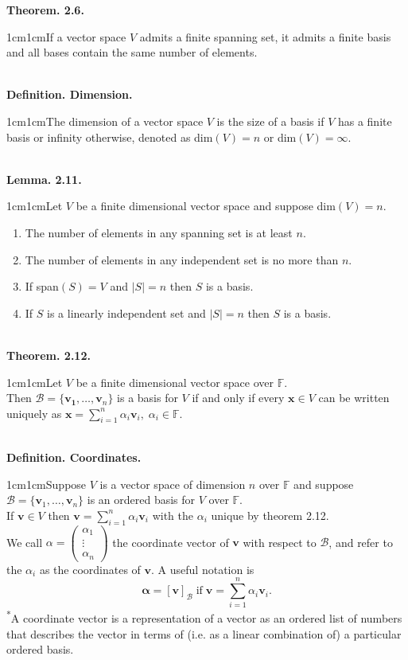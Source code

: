 \documentclass{article}
\newcommand{\vect}[1]{\mathbf{#1}}
\newcommand{\definition}[2]{\textbf{Definition. #1.}\begin{adjustwidth}{1cm}{1cm}#2\end{adjustwidth}}
\newcommand{\theorem}[2]{\textbf{Theorem. #1.}\begin{adjustwidth}{1cm}{1cm}#2\end{adjustwidth}}
\newcommand{\lemma}[2]{\textbf{Lemma. #1.}\begin{adjustwidth}{1cm}{1cm}#2\end{adjustwidth}}
\begin{document}
\theorem{2.6}{If a vector space $V$ admits a finite spanning set, it admits a finite basis and all bases contain the same number of elements.}~\\
\definition{Dimension}{The dimension of a vector space $V$ is the size of a basis if $V$ has a finite basis or infinity otherwise, denoted as dim$(V) = n$ or dim$(V) = \infty$.}~\\
\lemma{2.11}{Let $V$ be a finite dimensional vector space and suppose dim$(V) = n$. \begin{enumerate} \item The number of elements in any spanning set is at least $n$. \item The number of elements in any independent set is no more than $n$. \item If span$(S) = V$ and $|S| = n$ then $S$ is a basis. \item If $S$ is a linearly independent set and $|S| = n$ then $S$ is a basis. \end{enumerate} }~\\
\theorem{2.12}{Let $V$ be a finite dimensional vector space over $\mathbb{F}$.\\Then $\mathcal{B} = \{ \vect{v_1}, \ldots , \vect{v}_n \}$ is a basis for $V$ if and only if every $\vect{x} \in V$ can be written uniquely as $\vect{x} = \sum_{i=1}^n \alpha _i \vect{v}_i, \; \alpha _i \in \mathbb{F}$.}~\\
\definition{Coordinates}{Suppose $V$ is a vector space of dimension $n$ over $\mathbb{F}$ and suppose $\mathcal{B} = \{ \vect{v}_1, \ldots , \vect{v}_n \}$ is an ordered basis for $V$ over $\mathbb{F}$.\\If $\vect{v} \in V$ then $\vect{v} = \sum_{i=1}^n \alpha_i \vect{v}_i$ with the $\alpha_i$ unique by theorem 2.12.\\We call $\alpha = \begin{pmatrix}\alpha_1 \\ \vdots \\ \alpha_n\end{pmatrix}$ the coordinate vector of $\vect{v}$ with respect to $\mathcal{B}$, and refer to the $\alpha_i$ as the coordinates of $\vect{v}$. A useful notation is \[\vect{\alpha} = [\vect{v}]_{\mathcal{B}} \; \text{if} \; \vect{v} = \sum_{i=1}^n \alpha_i \vect{v} _i.\]\textsuperscript{*}A coordinate vector is a representation of a vector as an ordered list of numbers that describes the vector in terms of (i.e. as a linear combination of) a particular ordered basis.}~\\
\end{document}
